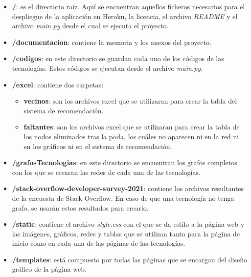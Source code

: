 \begin{itemize}
    \item \textbf{/}: es el directorio raíz. Aquí se encuentran aquellos ficheros necesarios para el despliegue de la aplicación en Heroku, la licencia, el archivo \textit{README} y el archivo \textit{main.py} desde el cual se ejecuta el proyecto.
    
    \item \textbf{/documentacion}: contiene la memoria y los anexos del proyecto.
    
    \item \textbf{/codigos}: en este directorio se guardan cada uno de los códigos de las tecnologías. Estos códigos se ejecutan desde el archivo \textit{main.py}.
    
    \item \textbf{/excel}: contiene dos carpetas:
    \begin{itemize}
        \item \textbf{vecinos}: son los archivos excel que se utilizaran para crear la tabla del sistema de recomendación.
        \item \textbf{faltantes}: son los archivos excel que se utilizaran para crear la tabla de los nodos eliminados tras la poda, los cuáles no aparecen ni en la red ni en los gráficos ni en el sistema de recomendación.
    \end{itemize}
    
    \item \textbf{/grafosTecnologias}: en este directorio se encuentran los grafos completos con los que se crearan las redes de cada una de las tecnologías.
    
    \item \textbf{/stack-overflow-developer-survey-2021}: contiene los archivos resultantes de la encuesta de Stack Overflow. En caso de que una tecnología no tenga grafo, se usarán estos resultados para crearlo.
    
    \item \textbf{/static}: contiene el archivo \textit{style.css} con el que se da estilo a la página web y las imágenes, gráficos, redes y tablas que se utilizan tanto para la página de inicio como en cada una de las páginas de las tecnologías.
    
    \item \textbf{/templates}: está compuesto por todas las páginas que se encargan del diseño gráfico de la página web.
    
\end{itemize}

